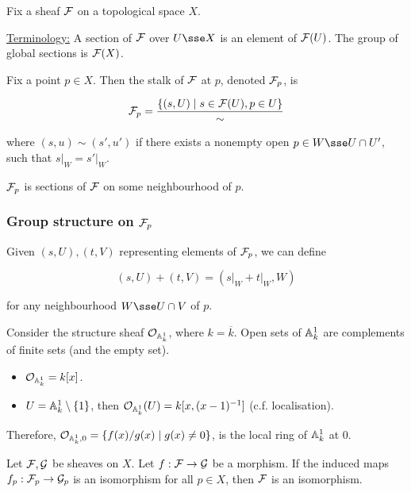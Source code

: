 \documentclass{article}
\newcommand{\set}[1]{\left\{#1\right\}}
\begin{document}
Fix a sheaf \(\mathcal{F}\) on a topological space \(X\).

\underline{Terminology:} A section of \(\mathcal{F}\) over \(U \sse X\) is an element of \(\mathcal{F}(U)\). The group of global sections is \(\mathcal{F}(X)\).

\begin{definition}
    [Stalk] Fix a point \(p \in X\). Then the stalk of \(\mathcal{F}\) at \(p\), denoted \(\mathcal{F}_p\), is

    \[\mathcal{F}_p = \frac{\left\{(s, U) \mid s \in \mathcal{F}(U), p \in U\right\}}{\sim}\]

    where \((s, u)\sim (s', u')\) if there exists a nonempty open \(p \in W \sse U \cap U'\), such that \(s\vert_W = s'\vert_W\).
\end{definition}

\(\mathcal{F}_p\) is sections of \(\mathcal{F}\) on some neighbourhood of \(p\).

\subsubsection*{Group structure on \(\mathcal{F}_p\)}

Given \((s, U), (t, V)\) representing elements of \(\mathcal{F}_p\), we can define

\[(s, U) + (t, V) = (s\vert_{W} + t\vert_W, W)\]

for any neighbourhood \(W \sse U \cap V\) of \(p\).

\begin{example}
    Consider the structure sheaf \(\mathcal{O}_{\mathbb{A}_{k}^{1}}\), where \(k = \overline k\). Open sets of \(\mathbb{A}_{k}^{1}\) are complements of finite sets (and the empty set).

    \begin{itemize}
        \item \(\mathcal{O}_{\mathbb{A}_{k}^{1}} = k[x]\).
        \item \(U = \aff k 1 \setminus \set 1\), then \(\mathcal{O}_{\mathbb{A}_{k}^{1}}(U) = k[x, (x-1)^{-1}]\) (c.f. localisation).
    \end{itemize}

    Therefore, \(\mathcal{O}_{\mathbb{A}_{k}^{1}, 0} = \left\{f(x)/g(x) \mid g(x) \ne 0\right\}\), is the local ring of \(\mathbb{A}_{k}^{1}\) at \(0\).
\end{example}

\begin{proposition}
    Let \(\mathcal{F}, \mathcal{G}\) be sheaves on \(X\). Let \(f : \mathcal{F} \to \mathcal{G}\) be a morphism. If the induced maps \(f_p : \mathcal{F}_p \to \mathcal{G}_p\) is an isomorphism for all \(p \in X\), then \(\mathcal{F}\) is an isomorphism.
\end{proposition}
\end{document}
